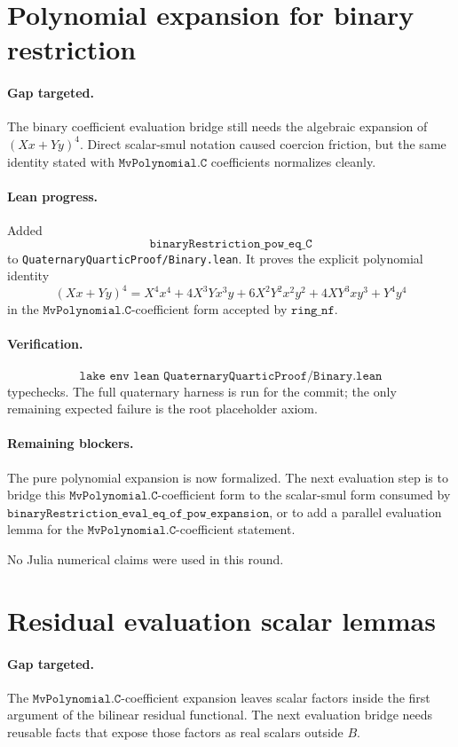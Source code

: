 \documentclass[11pt]{article}
\begin{document}
\section*{Polynomial expansion for binary restriction}

\paragraph{Gap targeted.}
The binary coefficient evaluation bridge still needs the algebraic expansion
of \((Xx+Yy)^4\).  Direct scalar-smul notation caused coercion friction, but
the same identity stated with \(\texttt{MvPolynomial.C}\) coefficients
normalizes cleanly.

\paragraph{Lean progress.}
Added
\[
\texttt{binaryRestriction\_pow\_eq\_C}
\]
to \texttt{QuaternaryQuarticProof/Binary.lean}.  It proves the explicit
polynomial identity
\[
(Xx+Yy)^4
=X^4x^4+4X^3Yx^3y+6X^2Y^2x^2y^2+4XY^3xy^3+Y^4y^4
\]
in the \(\texttt{MvPolynomial.C}\)-coefficient form accepted by
\(\texttt{ring\_nf}\).

\paragraph{Verification.}
\[
\texttt{lake env lean QuaternaryQuarticProof/Binary.lean}
\]
typechecks.  The full quaternary harness is run for the commit; the only
remaining expected failure is the root placeholder axiom.

\paragraph{Remaining blockers.}
The pure polynomial expansion is now formalized.  The next evaluation step is
to bridge this \(\texttt{MvPolynomial.C}\)-coefficient form to the scalar-smul
form consumed by
\(\texttt{binaryRestriction\_eval\_eq\_of\_pow\_expansion}\), or to add a
parallel evaluation lemma for the \(\texttt{MvPolynomial.C}\)-coefficient
statement.

No Julia numerical claims were used in this round.

\section*{Residual evaluation scalar lemmas}

\paragraph{Gap targeted.}
The \(\texttt{MvPolynomial.C}\)-coefficient expansion leaves scalar factors
inside the first argument of the bilinear residual functional.  The next
evaluation bridge needs reusable facts that expose those factors as real
scalars outside \(B\).
\end{document}
